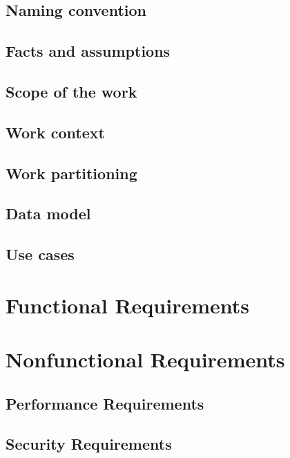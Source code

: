 \documentclass{scrreprt}
\begin{document}
\section{Naming convention}

\section{Facts and assumptions}

\section{Scope of the work}

\section{Work context}

\section{Work partitioning}

\section{Data model}

\section{Use cases}

\chapter{Functional Requirements}

\chapter{Nonfunctional Requirements}

\section{Performance Requirements}

\section{Security Requirements}

\nocite{*}
\end{document}
